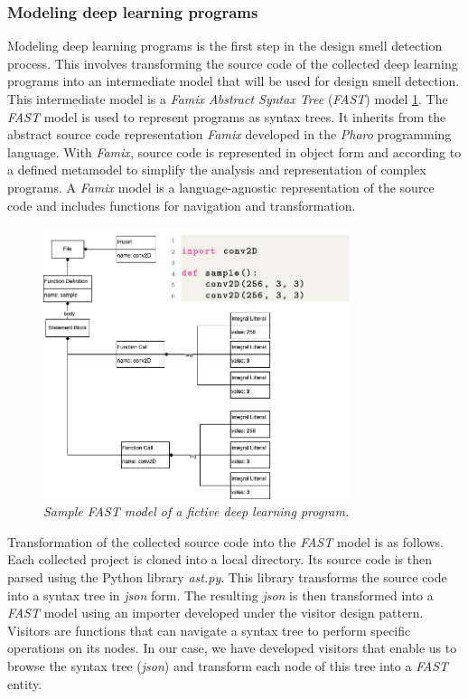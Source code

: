 \subsubsection{Modeling deep learning programs}
\label{sec:modelingDeepLearningPrograms}
Modeling deep learning programs is the first step in the design smell detection process. This involves transforming the source code of the collected deep learning programs into an intermediate model that will be used for design smell detection. This intermediate model is a \emph{Famix Abstract Syntax Tree} (\emph{FAST}) model \ref{fig:fast}. The \emph{FAST} model is used to represent programs as syntax trees. It inherits from the abstract source code representation \emph{Famix} developed in the \emph{Pharo} programming language. With \emph{Famix}, source code is represented in object form and according to a defined metamodel to simplify the analysis and representation of complex programs. A \emph{Famix} model is a language-agnostic representation of the source code and includes functions for navigation and transformation.\\

\begin{figure}[h]
  \centering
  \includegraphics[width=0.8\textwidth]{figure/fast.png}
  \caption{\emph{Sample \emph{FAST} model of a fictive deep learning program.}}
  \label{fig:fast}
\end{figure}

Transformation of the collected source code into the \emph{FAST} model is as follows. Each collected project is cloned into a local directory. Its source code is then parsed using the Python library \emph{ast.py}. This library transforms the source code into a syntax tree in \emph{json} form. The resulting \emph{json} is then transformed into a \emph{FAST} model using an importer developed under the visitor design pattern. Visitors are functions that can navigate a syntax tree to perform specific operations on its nodes. In our case, we have developed visitors that enable us to browse the syntax tree (\emph{json}) and transform each node of this tree into a \emph{FAST} entity.\\

